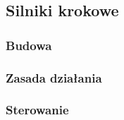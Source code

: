 \subsection{Silniki krokowe}

\subsubsection{Budowa}

\subsubsection{Zasada działania}

\subsubsection{Sterowanie}



\clearpage

